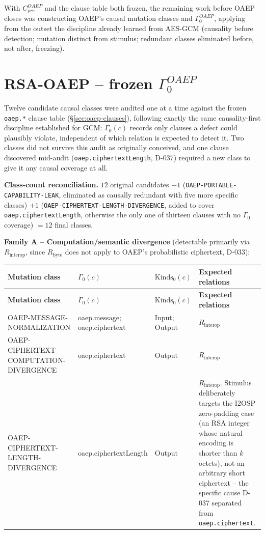 \documentclass[11pt,a4paper]{article}
\begin{document}
With $C_{pre}^{OAEP}$ and the clause table both frozen, the remaining work before OAEP closes was constructing OAEP's causal mutation classes and $\Gamma_0^{OAEP}$, applying from the outset the discipline already learned from AES-GCM (causality before detection; mutation distinct from stimulus; redundant classes eliminated before, not after, freezing).

\section{RSA-OAEP -- frozen $\Gamma_0^{OAEP}$}\label{sec:oaep-gamma0}
Twelve candidate causal classes were audited one at a time against the frozen \texttt{oaep.*} clause table (\S\ref{sec:oaep-clauses}), following exactly the same causality-first discipline established for GCM: $\Gamma_0(c)$ records only clauses a defect could plausibly violate, independent of which relation is expected to detect it. Two classes did not survive this audit as originally conceived, and one clause discovered mid-audit (\texttt{oaep.ciphertextLength}, D-037) required a new class to give it any causal coverage at all.

\textbf{Class-count reconciliation.} $12$ original candidates $- 1$ (\texttt{OAEP-PORTABLE-CAPABILITY-LEAK}, eliminated as causally redundant with five more specific classes) $+ 1$ (\texttt{OAEP-CIPHERTEXT-LENGTH-DIVERGENCE}, added to cover \texttt{oaep.ciphertextLength}, otherwise the only one of thirteen clauses with no $\Gamma_0$ coverage) $= 12$ final classes.

\textbf{Family A -- Computation/semantic divergence} (detectable primarily via $R_{\text{interop}}$, since $R_{\text{byte}}$ does not apply to OAEP's probabilistic ciphertext, D-033):
\begin{longtable}{p{}p{}p{}p{}}
\toprule
\textbf{Mutation class} & \textbf{$\Gamma_0(c)$} & \textbf{$\text{Kinds}_0(c)$} & \textbf{Expected relations}\\
\midrule\endfirsthead
\toprule
\textbf{Mutation class} & \textbf{$\Gamma_0(c)$} & \textbf{$\text{Kinds}_0(c)$} & \textbf{Expected relations}\\
\midrule\endhead
OAEP-MESSAGE-NORMALIZATION & oaep.message; oaep.ciphertext & Input; Output & $R_{\text{interop}}$\\
OAEP-CIPHERTEXT-COMPUTATION-DIVERGENCE & oaep.ciphertext & Output & $R_{\text{interop}}$\\
OAEP-CIPHERTEXT-LENGTH-DIVERGENCE & oaep.ciphertextLength & Output & $R_{\text{interop}}$. Stimulus deliberately targets the I2OSP zero-padding case (an RSA integer whose natural encoding is shorter than $k$ octets), not an arbitrary short ciphertext -- the specific cause D-037 separated from \texttt{oaep.ciphertext}.\\
\bottomrule
\end{longtable}
\end{document}
